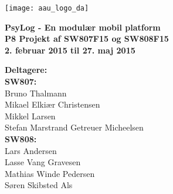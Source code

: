 \hspace*{-1cm}\parbox[b][\textheight][t]{\textwidth}
{

\begin{center}
	\texttt{[image: aau\_logo\_da]}\\
	\vspace{0.25cm}
\end{center} 

\vspace{1cm}
\begin{center}

\textbf{\Huge {PsyLog - En modulær mobil platform}} \\ \vspace{0.5cm}
\textbf{\Large P8 Projekt af SW807F15 og SW808F15}\\ \vspace{0.5cm}
\textbf{\large 2. februar 2015 til 27. maj 2015}\\
\end{center}



\vspace{0.25cm}
\begin{center}
\item {\textbf{Deltagere:}} \\
\textbf{SW807:}\\
Bruno Thalmann\\
Mikael Elkiær Christensen\\
Mikkel Larsen\\
Stefan Marstrand Getreuer Micheelsen\\[0.2cm]
\textbf{SW808:}\\
Lars Andersen\\
Lasse Vang Gravesen\\
Mathias Winde Pedersen\\
Søren Skibsted Als
\end{center}

\thispagestyle{empty}

\newpage
\thispagestyle{empty}
\mbox{}
}